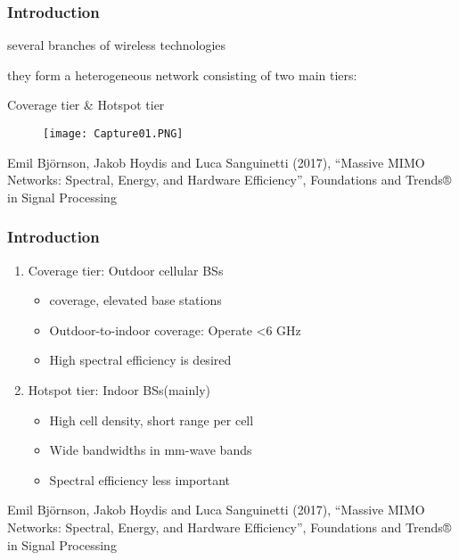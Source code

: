 \documentclass{beamer}
\begin{document}
\begin{frame}[fragile=singleslide]\frametitle{Introduction}
several branches of wireless technologies



they form a heterogeneous network consisting of two main tiers:



Coverage tier \& Hotspot tier
 
\begin{figure}
  \texttt{[image: Capture01.PNG]}
\end{figure}



\tiny Emil Björnson, Jakob Hoydis and Luca Sanguinetti (2017), “Massive MIMO Networks: Spectral, Energy, and Hardware Efficiency”, Foundations and Trends® in Signal Processing

\end{frame}



\begin{frame}[fragile=singleslide]\frametitle{Introduction}
\begin{enumerate}
\item Coverage tier: Outdoor cellular BSs
\begin{itemize}
\item coverage, elevated base stations
\item Outdoor-to-indoor coverage: Operate <6 GHz
\item High spectral efficiency is desired
\end{itemize}

\vspace{1.2cm}

\item Hotspot tier: Indoor BSs(mainly)
\begin{itemize}
\item High cell density, short range per cell
\item Wide bandwidths in mm-wave bands
\item Spectral efficiency less important
\end{itemize}
\end{enumerate}

\vspace{1.2cm}

\tiny Emil Björnson, Jakob Hoydis and Luca Sanguinetti (2017), “Massive MIMO Networks: Spectral, Energy, and Hardware Efficiency”, Foundations and Trends® in Signal Processing

\end{frame}
\end{document}
